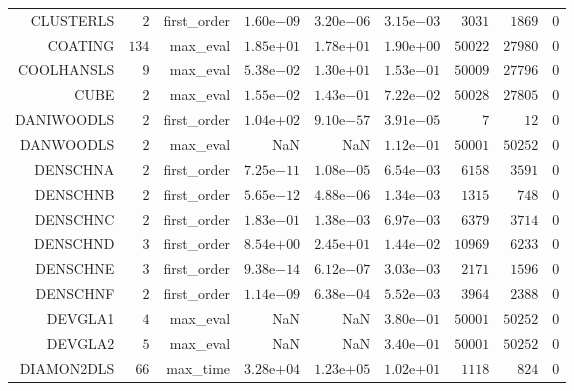 \begin{longtable}{rrrrrrrrr}
CLUSTERLS & \(     2\) & first\_order & \( 1.60\)e\(-09\) & \( 3.20\)e\(-06\) & \( 3.15\)e\(-03\) & \(  3031\) & \(  1869\) & \(     0\) \\
COATING & \(   134\) & max\_eval & \( 1.85\)e\(+01\) & \( 1.78\)e\(+01\) & \( 1.90\)e\(+00\) & \( 50022\) & \( 27980\) & \(     0\) \\
COOLHANSLS & \(     9\) & max\_eval & \( 5.38\)e\(-02\) & \( 1.30\)e\(+01\) & \( 1.53\)e\(-01\) & \( 50009\) & \( 27796\) & \(     0\) \\
CUBE & \(     2\) & max\_eval & \( 1.55\)e\(-02\) & \( 1.43\)e\(-01\) & \( 7.22\)e\(-02\) & \( 50028\) & \( 27805\) & \(     0\) \\
DANIWOODLS & \(     2\) & first\_order & \( 1.04\)e\(+02\) & \( 9.10\)e\(-57\) & \( 3.91\)e\(-05\) & \(     7\) & \(    12\) & \(     0\) \\
DANWOODLS & \(     2\) & max\_eval &       NaN &       NaN & \( 1.12\)e\(-01\) & \( 50001\) & \( 50252\) & \(     0\) \\
DENSCHNA & \(     2\) & first\_order & \( 7.25\)e\(-11\) & \( 1.08\)e\(-05\) & \( 6.54\)e\(-03\) & \(  6158\) & \(  3591\) & \(     0\) \\
DENSCHNB & \(     2\) & first\_order & \( 5.65\)e\(-12\) & \( 4.88\)e\(-06\) & \( 1.34\)e\(-03\) & \(  1315\) & \(   748\) & \(     0\) \\
DENSCHNC & \(     2\) & first\_order & \( 1.83\)e\(-01\) & \( 1.38\)e\(-03\) & \( 6.97\)e\(-03\) & \(  6379\) & \(  3714\) & \(     0\) \\
DENSCHND & \(     3\) & first\_order & \( 8.54\)e\(+00\) & \( 2.45\)e\(+01\) & \( 1.44\)e\(-02\) & \( 10969\) & \(  6233\) & \(     0\) \\
DENSCHNE & \(     3\) & first\_order & \( 9.38\)e\(-14\) & \( 6.12\)e\(-07\) & \( 3.03\)e\(-03\) & \(  2171\) & \(  1596\) & \(     0\) \\
DENSCHNF & \(     2\) & first\_order & \( 1.14\)e\(-09\) & \( 6.38\)e\(-04\) & \( 5.52\)e\(-03\) & \(  3964\) & \(  2388\) & \(     0\) \\
DEVGLA1 & \(     4\) & max\_eval &       NaN &       NaN & \( 3.80\)e\(-01\) & \( 50001\) & \( 50252\) & \(     0\) \\
DEVGLA2 & \(     5\) & max\_eval &       NaN &       NaN & \( 3.40\)e\(-01\) & \( 50001\) & \( 50252\) & \(     0\) \\
DIAMON2DLS & \(    66\) & max\_time & \( 3.28\)e\(+04\) & \( 1.23\)e\(+05\) & \( 1.02\)e\(+01\) & \(  1118\) & \(   824\) & \(     0\) \\

\end{longtable}
